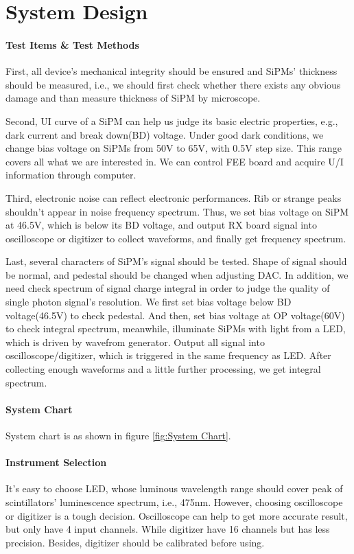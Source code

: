 \documentclass[11pt,a4paper]{article}
\begin{document}
\section{System Design}
\paragraph{Test Items \& Test Methods}First, all device's mechanical integrity should be ensured and SiPMs' thickness should be measured,
i.e., we should first check whether there exists any obvious damage and than measure thickness of SiPM by microscope.

Second, UI curve of a SiPM can help us judge its basic electric properties, e.g., dark current and break down(BD) voltage.
Under good dark conditions, we change bias voltage on SiPMs from 50V to 65V, with 0.5V step size. This range covers all what we are interested in.
We can control FEE board and acquire U/I information through computer.

Third, electronic noise can reflect electronic performances. Rib or strange peaks shouldn't appear in noise frequency spectrum. Thus, we set bias voltage on
SiPM at 46.5V, which is below its BD voltage, and output RX board signal into oscilloscope or digitizer to collect waveforms, and finally get frequency spectrum.

Last, several characters of SiPM's signal should be tested. Shape of signal should be normal, and pedestal should be changed when adjusting DAC. In addition, we need check
spectrum of signal charge integral in order to judge the quality of single photon signal's resolution. We first set bias voltage below BD voltage(46.5V) to check pedestal. And
then, set bias voltage at OP voltage(60V) to check integral spectrum, meanwhile, illuminate SiPMs with light from a LED, which is driven by wavefrom generator. Output all signal
into oscilloscope/digitizer, which is triggered in the same frequency as LED. After collecting enough waveforms and a little further processing, we get integral spectrum.

\paragraph{System Chart}
System chart is as shown in figure \ref{fig:System Chart}.

\paragraph{Instrument Selection}It's easy to choose LED, whose luminous wavelength range should cover peak of scintillators' luminescence spectrum, i.e., 475nm.
However, choosing oscilloscope or digitizer is a tough decision. Oscilloscope can help to get more accurate result, but only have 4 input channels. While digitizer have
16 channels but has less precision. Besides, digitizer should be calibrated before using.
\end{document}
